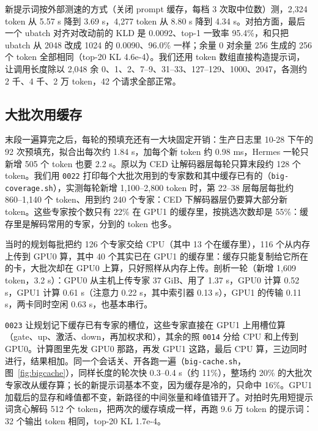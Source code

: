 \documentclass[11pt,a4paper]{article}
\newcommand{\code}[1]{\texttt{#1}}
\begin{document}
新提示词按外部测速的方式（关闭 prompt 缓存，每档 3 次取中位数）测，2,324 token 从 5.57 s 降到 3.69 s，4,277 token 从 8.80 s 降到 4.34 s。对拍方面，最后一个 ubatch 对齐对改动前的 KLD 是 0.0092、top-1 一致率 95.4\%，和只把 ubatch 从 2048 改成 1024 的 0.0090、96.0\% 一样；余量 0 对余量 256 生成的 256 个 token 全部相同（top-20 KL 4.6e-4）。我们还用 token 数组直接构造提示词，让调用长度除以 2,048 余 0、1、2、7--9、31--33、127--129、1000、2047，各测约 2 千、4 千、2 万 token，42 个请求全部正常。

\subsection{大批次用缓存}
\label{sec:bigcache}

末段一遍算完之后，每轮的预填充还有一大块固定开销：生产日志里 10-28 下午的 92 次预填充，拟合出每次约 1.84 s，加每个新 token 约 0.98 ms，Hermes 一轮只新增 505 个 token 也要 2.2 s。原以为 CED 让解码器层每轮只算末段约 128 个 token。我们用 \code{0022} 打印每个大批次用到的专家数和其中缓存已有的（\code{big-coverage.sh}），实测每轮新增 1,100--2,800 token 时，第 22--38 层每层每批约 860--1,140 个 token、用到约 240 个专家：CED 下解码器层仍要算大部分新 token。这些专家按个数只有 22\% 在 GPU1 的缓存里，按挑选次数却是 55\%：缓存里是解码常用的专家，分到的 token 也多。

当时的规划每批把约 126 个专家交给 CPU（其中 13 个在缓存里），116 个从内存上传到 GPU0 算，其中 40 个其实已在 GPU1 的缓存里：缓存只能复制给它所在的卡，大批次却在 GPU0 上算，只好照样从内存上传。剖析一轮（新增 1,609 token，3.2 s）：GPU0 从主机上传专家 37 GiB、用了 1.37 s，GPU0 计算 0.52 s，GPU1 计算 0.61 s（注意力 0.22 s，其中索引器 0.13 s），GPU1 的传输 0.11 s，两卡同时空闲 0.63 s，也基本串行。

\code{0023} 让规划记下缓存已有专家的槽位，这些专家直接在 GPU1 上用槽位算（gate、up、激活、down，再加权求和），其余的照 \code{0014} 分给 CPU 和上传到 GPU0。计算图里先发 GPU0 那路，再发 GPU1 这路，最后 CPU 算，三边同时进行，结果相加。同一个会话关、开各跑一遍（\code{big-cache.sh}，图~\ref{fig:bigcache}），同样长度的轮次快 0.3--0.4 s（约 11\%），整场约 20\% 的大批次专家改从缓存算；长的新提示词基本不变，因为缓存是冷的，只命中 16\%。GPU1 加载后的显存和峰值都不变，新路径的中间张量和峰值错开了。对拍时先用短提示词贪心解码 512 个 token，把两次的缓存填成一样，再跑 9.6 万 token 的提示词：32 个输出 token 相同，top-20 KL 1.7e-4。
\end{document}
